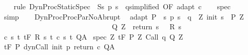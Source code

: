 \begin{isabellebody}
%
\isadelimproof
\ \ %
\endisadelimproof
%
\isatagproof
{}\isamarkupfalse%
\ {\isacharparenleft}rule\ DynProcStaticSpec\ {\isacharbrackleft}\ S{\isacharequal}{\isachardoublequoteopen}{\isacharbraceleft}s{\isachardot}\ p\ s\ {\isacharequal}\ q{\isacharbraceright}{\isachardoublequoteclose}{\isacharcomma}simplified{\isacharcomma}\ OF\ adapt\ c{\isacharbrackright}{\isacharparenright}\isanewline
\ \ \isamarkupfalse%
\ spec\isanewline
\ \ \isamarkupfalse%
\ simp\isanewline
\ \ \isamarkupfalse%
%
\endisatagproof
{\isafoldproof}%
%
\isadelimproof
\isanewline
%
\endisadelimproof
\isanewline
\isanewline
{}\isamarkupfalse%
\ DynProcProcParNoAbrupt{\isacharcolon}\ \isanewline
{}\ adapt{\isacharcolon}\ {\isachardoublequoteopen}P\ {\isasymsubseteq}\ {\isacharbraceleft}s{\isachardot}\ p\ s\ {\isacharequal}\ q\ {\isasymand}\ {\isacharparenleft}{\isasymexists}Z{\isachardot}\ init\ s\ {\isasymin}\ P{\isacharprime}\ Z\ \ {\isasymand}\ \isanewline
\ \ \ \ \ \ \ \ \ \ \ \ \ \ \ \ \ \ \ \ \ \ \ \ \ \ \ \ {\isacharparenleft}{\isasymforall}{\isasymtau}{\isachardot}\ {\isasymtau}\ {\isasymin}\ Q{\isacharprime}\ Z\ {\isasymlongrightarrow}\ return\ s\ {\isasymtau}\ {\isasymin}\ R\ s\ {\isasymtau}{\isacharparenright}{\isacharparenright}{\isacharbraceright}{\isachardoublequoteclose}\isanewline
{}\ c{\isacharcolon}\ {\isachardoublequoteopen}{\isasymforall}s\ t{\isachardot}\ {\isasymGamma}{\isacharcomma}{\isasymTheta}{\isasymturnstile}\isactrlsub t\isactrlbsub {\isacharslash}F\isactrlesub \ {\isacharparenleft}R\ s\ t{\isacharparenright}\ {\isacharparenleft}c\ s\ t{\isacharparenright}\ Q{\isacharcomma}A{\isachardoublequoteclose}\isanewline
{}\ spec{\isacharcolon}\ {\isachardoublequoteopen}{\isasymforall}Z{\isachardot}\ {\isasymGamma}{\isacharcomma}{\isasymTheta}{\isasymturnstile}\isactrlsub t\isactrlbsub {\isacharslash}F\isactrlesub \ {\isacharparenleft}P{\isacharprime}\ Z{\isacharparenright}\ Call\ q\ {\isacharparenleft}Q{\isacharprime}\ Z{\isacharparenright}{\isacharcomma}{\isacharbraceleft}{\isacharbraceright}{\isachardoublequoteclose}\isanewline
{}\ {\isachardoublequoteopen}{\isasymGamma}{\isacharcomma}{\isasymTheta}{\isasymturnstile}\isactrlsub t\isactrlbsub {\isacharslash}F\isactrlesub \ P\ {\isacharparenleft}dynCall\ init\ p\ return\ c{\isacharparenright}\ Q{\isacharcomma}A{\isachardoublequoteclose}\isanewline
%
\isadelimproof
%
\endisadelimproof
%
\isatagproof
{}\isamarkupfalse%
\ {\isacharminus}\ \ \isanewline

\end{isabellebody}
